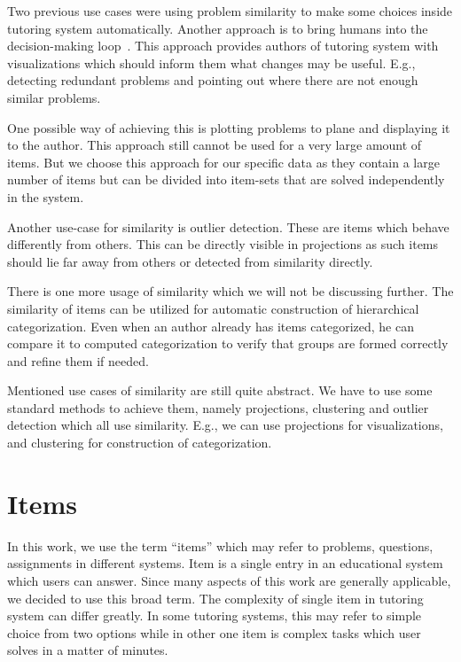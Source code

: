 \documentclass[
  printed, %
  table,   %
  nolof,     %
  nolot,     %
  color,
  final,
  nocover
]{fithesis3}
\begin{document}
Two previous use cases were using problem similarity to make some choices inside tutoring system automatically. Another approach is to bring humans into the decision-making loop~\cite{baker2016stupid}. This approach provides authors of tutoring system with visualizations which should inform them what changes may be useful. E.g., detecting redundant problems and pointing out where there are not enough similar problems.

One possible way of achieving this is plotting problems to plane and displaying it to the author. This approach still cannot be used for a very large amount of items. But we choose this approach for our specific data as they contain a large number of items but can be divided into item-sets that are solved independently in the system.

Another use-case for similarity is outlier detection. These are items which behave differently from others. This can be directly visible in projections as such items should lie far away from others or detected from similarity directly.

There is one more usage of similarity which we will not be discussing further. The similarity of items can be utilized for automatic construction of hierarchical categorization. Even when an author already has items categorized, he can compare it to computed categorization to verify that groups are formed correctly and refine them if needed.


Mentioned use cases of similarity are still quite abstract. We have to use some standard methods to achieve them, namely projections, clustering and outlier detection which all use similarity. E.g., we can use projections for visualizations, and clustering for construction of categorization.


\section{Items}\label{items}


In this work, we use the term ``items'' which may refer to problems, questions, assignments in different systems. Item is a single entry in an educational system which users can answer. Since many aspects of this work are generally applicable, we decided to use this broad term. The complexity of single item in tutoring system can differ greatly. In some tutoring systems, this may refer to simple choice from two options while in other one item is complex tasks which user solves in a matter of minutes.
\end{document}
